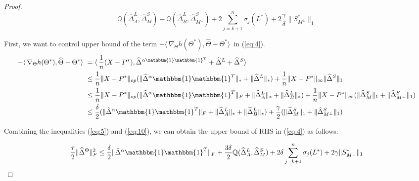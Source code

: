 \documentclass[AMS,STIX1COL]{WileyNJD-v2}
\begin{document}
\begin{proof}
\begin{equation}\label{eq:5}
    \mathbb{Q}(\widehat{\Delta}^L_{A},\widehat{\Delta}^S_{M}) - \mathbb{Q}(\widehat{\Delta}^L_{B},\widehat{\Delta}^S_{M^\perp})
    +2 \sum_{j=k+1}^{n} \sigma_{j}(L^*) + 2\frac{\gamma}{\delta}\|S^*_{M^\perp}\|_{1}
\end{equation}

First, we want to control upper bound of the term $-\langle\,\nabla_{\Theta}h(\Theta^{*}),\widehat{\Theta}-\Theta^{*} \rangle\,$
in (\ref{eq:4}).
\begin{align}
-\langle\,\nabla_{\Theta}h(\Theta^{*}),\widehat{\Theta}-\Theta^{*} \rangle\  \nonumber
&=\langle\, \frac{1}{n} (X - P^*), \widehat\Delta^{\alpha\mathbbm{1}\mathbbm{1}^T} + \widehat\Delta^{L} + \widehat\Delta^{S} \rangle\ \\ \nonumber
&\leq \frac{1}{n} \|X - P^*\|_{op}(\|\widehat{\Delta}^{\alpha}\mathbbm{1}\mathbbm{1}^T\|_\ast + \|\widehat{\Delta}^{L}\|_\ast) +  \frac{1}{n} \|X - P^*\|_{\infty}\|\widehat{\Delta}^{S}\|_{1} \\ \nonumber
&\leq \frac{1}{n} \|X - P^*\|_{op}(\|\widehat{\Delta}^{\alpha}\mathbbm{1}\mathbbm{1}^T\|_{F} + \|\widehat{\Delta}^{L}_{A}\|_\ast + \|\widehat{\Delta}^{L}_{B}\|_\ast) +
\frac{1}{n} \|X - P^*\|_{\infty}(\|\widehat{\Delta}^{S}_{M}\|_{1} + 
\|\widehat{\Delta}^{S}_{M^{\perp}}\|_{1}) \\ 
&\leq \frac{\delta}{2}(\|\hat{\Delta}^{\alpha}\mathbbm{1}\mathbbm{1}^T\|_{F} + \|\widehat{\Delta}^{L}_{A}\|_\ast + \|\widehat{\Delta}^{L}_{B}\|_\ast) + \frac{\gamma}{2}(\|\widehat{\Delta}^{S}_{M}\|_{1} + 
\|\hat{\Delta}^{S}_{M^{\perp}}\|_{1})  \label{eq:10}
\end{align}

Combining the inequalities (\ref{eq:5}) and (\ref{eq:10}), we can obtain the upper bound of RHS in (\ref{eq:4}) as follows:

\begin{equation}
    \frac{\tau}{2}\|\widehat{\Delta}^{\Theta}\|_{F}^{2} \leq
    \frac{\delta}{2}\|\hat{\Delta}^{\alpha}\mathbbm{1}\mathbbm{1}^T\|_{F} + 
    \frac{3\delta}{2}\mathbb{Q}(\widehat{\Delta}^L_{A},\widehat{\Delta}^S_{M})
    +2 \delta \sum_{j=k+1}^{n} \sigma_{j}(L^*) + 2\gamma \|S^*_{M^\perp}\|_{1}
    \label{eq:11}
\end{equation}


\end{proof}
\end{document}
